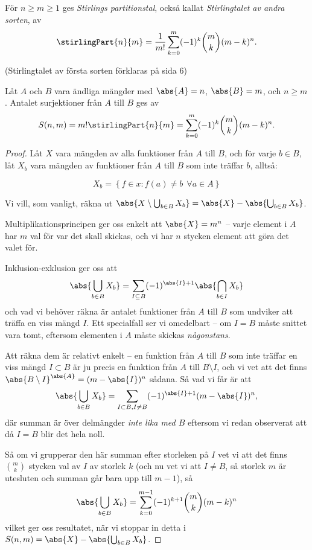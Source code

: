 \documentclass[nobib]{tufte-handout}
\begin{document}
\begin{definition}
  För $n \geq m \geq 1$ ges \emph{Stirlings partitionstal}, också kallat \emph{Stirlingtalet av andra sorten}, av
  $$\stirlingPart{n}{m} = \frac{1}{m!}\sum_{k=0}^{m}(-1)^k\binom{m}{k}(m-k)^n.$$
\end{definition}
(Stirlingtalet av första sorten förklaras på sida 6)

\begin{theorem}\label{theorem_count_surjections}
  Låt $A$ och $B$ vara ändliga mängder med $\abs{A} = n$, $\abs{B} = m$, och $n \geq m$. Antalet surjektioner från $A$ till $B$ ges av
  $$S(n,m) = m!\stirlingPart{n}{m} = \sum_{k=0}^{m} (-1)^k \binom{m}{k}(m-k)^n.$$

  \begin{proof}
    Låt $X$ vara mängden av alla funktioner från $A$ till $B$, och för varje $b \in B$, låt $X_b$ vara mängden av funktioner från $A$ till $B$ som inte träffar $b$, alltså:

$$ X_{b} = \left\{ f \in x : f(a) \neq b 	\:\: \forall a \in A \right\}$$
    
    Vi vill, som vanligt, räkna ut $\abs{X \setminus \bigcup_{b\in B} X_b} = \abs{X} - \abs{\bigcup_{b\in B} X_b}$.

    Multiplikationsprincipen ger oss enkelt att $\abs{X} = m^n$ -- varje element i $A$ har $m$ val för var det skall skickas, och vi har $n$ stycken element att göra det valet för.

    Inklusion-exklusion ger oss att
    $$\abs{\bigcup_{b\in B} X_b} = \sum_{I \subseteq B} (-1)^{\abs{I} + 1}\abs{\bigcap_{b \in I} X_b}$$
    och vad vi behöver räkna är antalet funktioner från $A$ till $B$ som undviker att träffa en viss mängd $I$. Ett specialfall ser vi omedelbart -- om $I = B$ måste snittet vara tomt, eftersom elementen i $A$ måste skickas \emph{någonstans}.

    Att räkna dem är relativt enkelt -- en funktion från $A$ till $B$ som inte träffar en viss mängd $I \subset B$ är ju precis en funktion från $A$ till $B \setminus I$, och vi vet att det finns $\abs{B \setminus I}^{\abs{A}} = (m - \abs{I})^n$ sådana. Så vad vi får är att
    $$\abs{\bigcup_{b\in B} X_b} = \sum_{I \subset B, I \neq B} (-1)^{\abs{I} + 1}(m - \abs{I})^n,$$
    där summan är över delmängder \emph{inte lika med $B$} eftersom vi redan observerat att då $I = B$ blir det hela noll.

    Så om vi grupperar den här summan efter storleken på $I$ vet vi att det finns $\binom{m}{k}$ stycken val av $I$ av storlek $k$ (och nu vet vi att $I \neq B$, så storlek $m$ är utesluten och summan går bara upp till $m-1$), så 
    $$\abs{\bigcup_{b\in B} X_b} = \sum_{k=0}^{m-1} (-1)^{k + 1}\binom{m}{k}(m - k)^n$$
    vilket ger oss resultatet, när vi stoppar in detta i $S(n,m) = \abs{X} - \abs{\bigcup_{b\in B} X_b}$.
  \end{proof}
\end{theorem}
\end{document}
